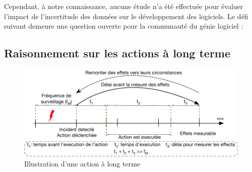 %
Cependant, à notre connaissance, aucune étude n'a été effectuée pour évaluer l'impact de l'incertitude des données sur le développement des logiciels. 
Le défi suivant demeure une question ouverte pour la communauté du génie logiciel :
\vspace{-2em}

\subsection{Raisonnement sur les actions à long terme}
\label{sec_french_challenges_longTermAct}

\begin{figure}
	\centering
	\includegraphics[width=0.9\linewidth]{img/apdx-french/challenges/longTermAct}
	\caption{Illustration d'une action à long terme}
	\label{fig_french_chal_longTermAct}
\end{figure}


